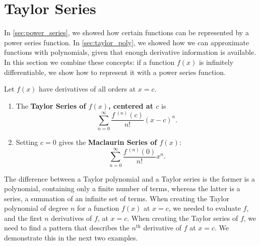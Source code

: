 \section{Taylor Series}\label{sec:taylor_series}

In \autoref{sec:power_series}, we showed how certain functions can be represented by a power series function. In \autoref{sec:taylor_poly}, we showed how we can approximate functions with polynomials, given that enough derivative information is available. In this section we combine these concepts: if a function $f(x)$ is infinitely differentiable, we show how to represent it with a power series function.

\begin{definition}\label{def:taylor_series}
Let $f(x)$ have derivatives of all orders at $x=c$.
\begin{enumerate}
	\item The \textbf{Taylor Series of $f(x)$, centered at $c$} is
	\[\sum_{n=0}^\infty \frac{f\,^{(n)}(c)}{n!}(x-c)^n.\]
	\item	Setting $c=0$ gives the \textbf{Maclaurin Series of $f(x)$}:
	\[\sum_{n=0}^\infty \frac{f\,^{(n)}(0)}{n!}x^n.\]
\end{enumerate}
\end{definition}


The difference between a Taylor polynomial and a Taylor series is the former is a polynomial, containing only a finite number of terms, whereas the latter is a series, a summation of an infinite set of terms. When creating the Taylor polynomial of degree $n$ for a function $f(x)$ at $x=c$, we needed to evaluate $f$, and the first $n$ derivatives of $f$, at $x=c$. When creating the Taylor series of $f$, we need to find a pattern that describes the $n^\text{th}$ derivative of $f$ at $x=c$. We demonstrate this in the next two examples.

